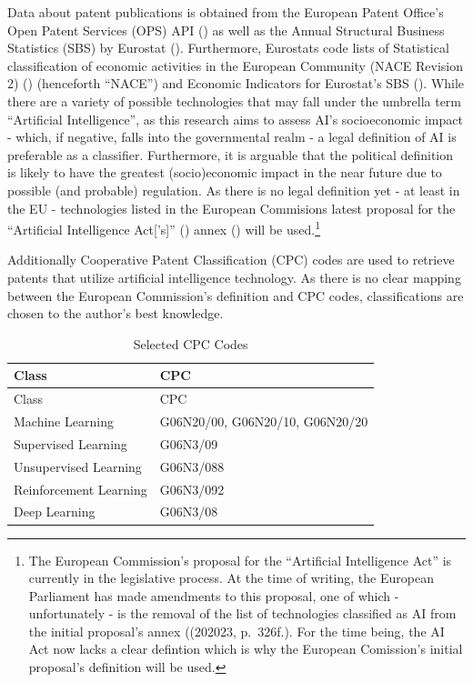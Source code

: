\documentclass[
  11,
  a4paperpaper,
]{article}
\begin{document}
Data about patent publications is obtained from the European Patent
Office's Open Patent Services (OPS) API
() as well as the Annual Structural Business Statistics (SBS) by
Eurostat ().
Furthermore, Eurostats code lists of Statistical classification of
economic activities in the European Community (NACE Revision 2)
() (henceforth
``NACE'') and Economic Indicators for Eurostat's SBS
(). While there
are a variety of possible technologies that may fall under the umbrella
term ``Artificial Intelligence'', as this research aims to assess AI's
socioeconomic impact - which, if negative, falls into the governmental
realm - a legal definition of AI is preferable as a classifier.
Furthermore, it is arguable that the political definition is likely to
have the greatest (socio)economic impact in the near future due to
possible (and probable) regulation. As there is no legal definition yet
- at least in the EU - technologies listed in the European Commisions
latest proposal for the ``Artificial Intelligence Act{[}'s{]}''
() annex () will be used.\footnote{The European Commission's
  proposal for the ``Artificial Intelligence Act'' is currently in the
  legislative process. At the time of writing, the European Parliament
  has made amendments to this proposal, one of which - unfortunately -
  is the removal of the list of technologies classified as AI from the
  initial proposal's annex ((202023,
  p.~326f.). For the time being, the AI Act now lacks a clear defintion
  which is why the European Comission's initial proposal's definition
  will be used.}

Additionally Cooperative Patent Classification (CPC) codes are used to
retrieve patents that utilize artificial intelligence technology. As
there is no clear mapping between the European Commission's definition
and CPC codes, classifications are chosen to the author's best
knowledge.


\label{tbl-cpc-codes}
\begin{longtable}[]{@{}ll@{}}
\caption{\label{tbl-cpc-codes}Selected CPC Codes}\tabularnewline
\toprule\noalign{}
Class & CPC \\
\midrule\noalign{}
\endfirsthead
\toprule\noalign{}
Class & CPC \\
\midrule\noalign{}
\endhead
\bottomrule\noalign{}
\endlastfoot
Machine Learning & G06N20/00, G06N20/10, G06N20/20 \\
Supervised Learning & G06N3/09 \\
Unsupervised Learning & G06N3/088 \\
Reinforcement Learning & G06N3/092 \\
Deep Learning & G06N3/08 \\
\end{longtable}
\end{document}
